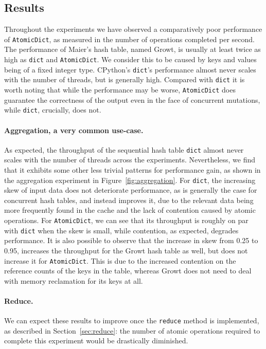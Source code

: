 \subsection{Results}\label{subsec:comparisons-results}

Throughout the experiments we have observed a comparatively poor performance of \texttt{AtomicDict}, as measured in the number of operations completed per second.
The performance of Maier's hash table, named Growt, is usually at least twice as high as \texttt{dict} and \texttt{AtomicDict}.
We consider this to be caused by keys and values being of a fixed integer type.
CPython's \texttt{dict}'s performance almost never scales with the number of threads, but is generally high.
Compared with \texttt{dict} it is worth noting that while the performance may be worse, \texttt{AtomicDict} does guarantee the correctness of the output even in the face of concurrent mutations, while \texttt{dict}, crucially, does not.

\paragraph{Aggregation, a very common use-case.} As expected, the throughput of the sequential hash table \texttt{dict} almost never scales with the number of threads across the experiments.
Nevertheless, we find that it exhibits some other less trivial patterns for performance gain, as shown in the aggregation experiment in Figure~\ref{fig:aggregation}.
For \texttt{dict}, the increasing skew of input data does not deteriorate performance, as is generally the case for concurrent hash tables, and instead improves it, due to the relevant data being more frequently found in the cache and the lack of contention caused by atomic operations.
For \texttt{AtomicDict}, we can see that its throughput is roughly on par with \texttt{dict} when the skew is small, while contention, as expected, degrades performance.
It is also possible to observe that the increase in skew from 0.25 to 0.95, increases the throughput for the Growt hash table as well, but does not increase it for \texttt{AtomicDict}.
This is due to the increased contention on the reference counts of the keys in the table, whereas Growt does not need to deal with memory reclamation for its keys at all.

\paragraph{Reduce.}
We can expect these results to improve once the \texttt{reduce} method is implemented, as described in Section~\ref{sec:reduce}: the number of atomic operations required to complete this experiment would be drastically diminished.

